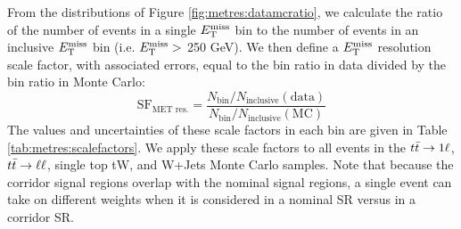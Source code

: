 From the distributions of Figure \ref{fig:metres:datamcratio}, we
calculate the ratio of the number of events in a single $E_\text{T}^\text{miss}$ bin to
the number of events in an inclusive $E_\text{T}^\text{miss}$ bin (i.e. $E_\text{T}^\text{miss} >$ 250
GeV). We then define a $E_\text{T}^\text{miss}$ resolution scale factor, with associated
errors, equal to the bin ratio in data divided by the bin ratio in
Monte Carlo:
\begin{equation}
\text{SF}_\text{MET res.} = \frac{N_\text{bin} / N_\text{inclusive} (\text{data})}
{N_\text{bin} / N_\text{inclusive} (\text{MC})}
\end{equation}
The values and uncertainties of these scale factors in each bin are
given in Table \ref{tab:metres:scalefactors}. We apply these scale
factors to all events in the $t\bar{t} \rightarrow 1\ell$, $t\bar{t} \rightarrow \ell\ell$, single top tW,
and W+Jets Monte Carlo samples. Note that because the corridor signal
regions overlap with the nominal signal regions, a single
event can take on different weights when it is considered in a nominal
SR versus in a corridor SR.

